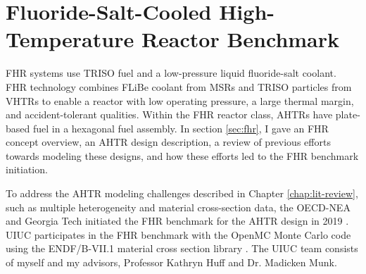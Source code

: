 \chapter{Fluoride-Salt-Cooled High-Temperature Reactor Benchmark}
\glsresetall
\label{chap:fhr-benchmark}
\gls{FHR} systems use \gls{TRISO} fuel and a low-pressure liquid fluoride-salt coolant.
\gls{FHR} technology combines \gls{FLiBe} coolant from \glspl{MSR} and 
\gls{TRISO} particles from \glspl{VHTR} to enable a reactor with 
low operating pressure, a large thermal margin, and accident-tolerant 
qualities.
Within the \gls{FHR} reactor class, \glspl{AHTR} have plate-based fuel in a hexagonal 
fuel assembly. 
In section \ref{sec:fhr}, I gave an \gls{FHR} concept overview, 
an \gls{AHTR} design description, a review of previous efforts 
towards modeling these designs, and how these efforts led to the \gls{FHR} benchmark
initiation. 

To address the \gls{AHTR} modeling challenges described in Chapter 
\ref{chap:lit-review}, such as multiple heterogeneity and material cross-section 
data, the \gls{OECD}-\gls{NEA} and \gls{Georgia Tech} initiated the \gls{FHR} 
benchmark for the \gls{AHTR} design in 2019 \cite{petrovic_benchmark_2021}. 
\gls{UIUC} participates in the \gls{FHR} benchmark with the OpenMC Monte Carlo code 
\cite{romano_openmc_2013} using the ENDF/B-VII.1 material cross section library 
\cite{chadwick_endf/b-vii.1_2011}.
The \gls{UIUC} team consists of myself and my advisors, Professor Kathryn Huff and Dr.
Madicken Munk. 

